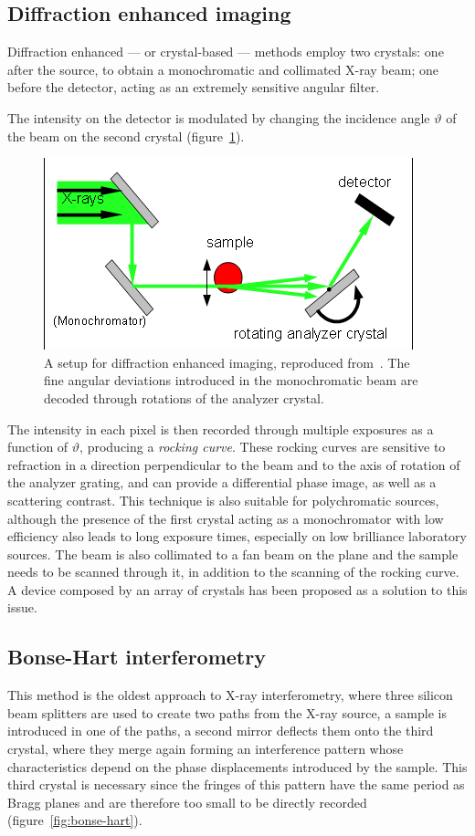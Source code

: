 \subsection{Diffraction enhanced imaging}
Diffraction enhanced --- or crystal-based --- methods employ two crystals:
one after the source, to obtain a monochromatic and collimated X-ray beam;
one before the detector, acting as an extremely sensitive angular filter.

The intensity on the detector is modulated by changing the incidence angle
$\vartheta$ of the beam on the second crystal (figure~\ref{fig:dei}).
\begin{figure}[htb]
    \centering
    \includegraphics[width=.6\textwidth]{gfx/analyzer-based_imaging.png}
    \caption[Analyzer-based setup.]{A setup for diffraction enhanced
        imaging, reproduced from~\cite{analyzer-based-picture}. The fine angular deviations introduced in the
    monochromatic beam are decoded through rotations of the analyzer crystal.}
    \label{fig:dei}
\end{figure}
The intensity in each pixel is then recorded through multiple exposures as a
function of $\vartheta$, producing a \emph{rocking curve}. These rocking
curves are sensitive to refraction in a direction perpendicular to the beam
and to the axis of rotation of the analyzer grating, and can provide a
differential phase image, as well as a scattering contrast. This technique
is also suitable for polychromatic sources, although the presence of the
first crystal acting as a monochromator with low efficiency also leads to
long exposure times, especially on low brilliance laboratory sources. The
beam is also collimated to a fan beam on the plane and the sample needs to
be scanned through it, in addition to the scanning of the rocking curve. A
device composed by an array of crystals has been proposed as a solution to
this issue.

\subsection{Bonse-Hart interferometry}
This method is the oldest approach to X-ray interferometry, where three
silicon beam splitters are used to create two paths from the X-ray source, a
sample is introduced in one of the paths, a second mirror deflects them onto
the third crystal, where they merge again forming an interference pattern
whose characteristics depend on the phase displacements introduced by the
sample. This third crystal is necessary since the fringes of this pattern
have the same period as Bragg planes and are therefore too small to be
directly recorded (figure~\ref{fig:bonse-hart}).

